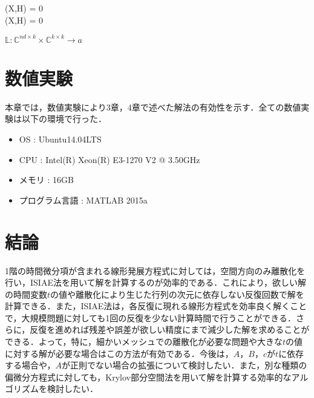 \documentclass[a4paper,12pt]{nodlabpabw}
\newenvironment{Eqnarray*}%
{\arraycolsep 0.14em\begin{eqnarray*}}{\end{eqnarray*}}
\begin{document}
\begin{Eqnarray*}
(X,H) = 0 \\
(X,H) = 0
\end{Eqnarray*}

$\mathbb{L}: \mathbb{C}^{nd\times k} \times \mathbb{C}^{k\times k} \rightarrow a$



%
\chapter{数値実験}
本章では，数値実験により3章，4章で述べた解法の有効性を示す．全ての数値実験は以下の環境で行った．
\begin{itemize}
\item OS : Ubuntu14.04LTS
\item CPU : Intel(R) Xeon(R) E3-1270 V2 @ 3.50GHz
\item メモリ : 16GB
\item プログラム言語 : MATLAB 2015a
\end{itemize}
%
\chapter{結論}
1階の時間微分項が含まれる線形発展方程式に対しては，空間方向のみ離散化を行い，ISIAE法を用いて解を計算するのが効率的である．これにより，欲しい解の時間変数$t$の値や離散化により生じた行列の次元に依存しない反復回数で解を計算できる．また，ISIAE法は，各反復に現れる線形方程式を効率良く解くことで，大規模問題に対しても1回の反復を少ない計算時間で行うことができる．さらに，反復を進めれば残差や誤差が欲しい精度にまで減少した解を求めることができる．よって，特に，細かいメッシュでの離散化が必要な問題や大きな$t$の値に対する解が必要な場合はこの方法が有効である．今後は，$A$，$B$，$c$が$t$に依存する場合や，$A$が正則でない場合の拡張について検討したい．また，別な種類の偏微分方程式に対しても，Krylov部分空間法を用いて解を計算する効率的なアルゴリズムを検討したい．
%
\end{document}
